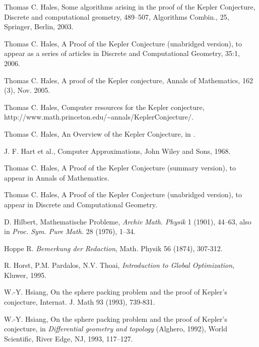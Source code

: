 \begin{thebibliography}{CHMS94}
 Thomas C. Hales, Some algorithms arising in
the proof of the Kepler Conjecture, Discrete and computational
geometry, 489--507, Algorithms Combin., 25, Springer, Berlin,
2003.

 Thomas C. Hales, A Proof of the
Kepler Conjecture (unabridged version), to appear as a series of
articles in Discrete and Computational Geometry, 35:1, 2006.

 Thomas C. Hales, A proof of the
Kepler conjecture, Annals of Mathematics, 162 (3), Nov. 2005.

 Thomas C. Hales, Computer resources for the Kepler conjecture, \hfill\break
    http://www.math.princeton.edu/\~\!annals/KeplerConjecture/.

 Thomas C. Hales, An
Overview of the Kepler Conjecture, in \cite{KC}.




 J. F. Hart et al., Computer Approximations,
John Wiley and Sons, 1968.



 Thomas C. Hales, A Proof of the
Kepler Conjecture (summary version), to appear in Annals of
Mathematics.

 Thomas C. Hales, A Proof of the
Kepler Conjecture (unabridged version), to appear in Discrete and
Computational Geometry.


 D. Hilbert, Mathematische Probleme, {\it Archiv Math. Physik} 1 (1901),
    44--63, also in {\it Proc. Sym. Pure Math.} 28 (1976), 1--34.

 Hoppe R. {\it Bemerkung der Redaction}, Math. Physik 56
(1874), 307-312.

 R. Horst, P.M. Pardalos, N.V. Thoai, {\it Introduction
    to Global Optimization}, Kluwer, 1995.

 W.-Y. Hsiang, On the sphere packing problem and the proof
    of Kepler's conjecture, Internat. J. Math 93 (1993), 739-831.

 W.-Y. Hsiang, On the sphere packing problem and the
    proof of Kepler's conjecture, in {\it Differential geometry and
    topology} (Alghero, 1992), World Scientific, River Edge,
    NJ, 1993,  117--127.


\end{thebibliography}
